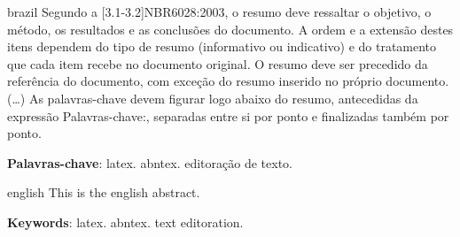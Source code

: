 \setlength{\absparsep}{18pt} %
\begin{resumo}[Resumo]
 \begin{otherlanguage*}{brazil}
    Segundo a [3.1-3.2]{NBR6028:2003}, o resumo deve ressaltar o objetivo,
    o método, os resultados e as conclusões do documento. A ordem e a extensão destes
    itens dependem do tipo de resumo (informativo ou indicativo) e do tratamento que
    cada item recebe no documento original. O resumo deve ser precedido da referência
    do documento, com exceção do resumo inserido no próprio documento. (\ldots) As
    palavras-chave devem figurar logo abaixo do resumo, antecedidas da expressão
    Palavras-chave:, separadas entre si por ponto e finalizadas também por ponto.

    \textbf{Palavras-chave}: latex. abntex. editoração de texto.
 \end{otherlanguage*}
\end{resumo}
\begin{resumo}[Abstract]
 \begin{otherlanguage*}{english}
    This is the english abstract.
    
    \textbf{Keywords}: latex. abntex. text editoration.
 \end{otherlanguage*}
\end{resumo}
